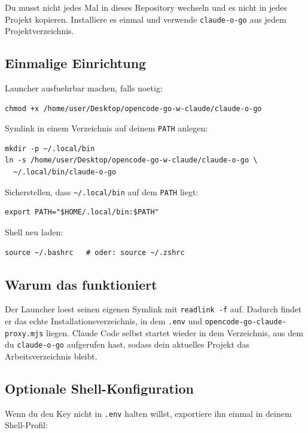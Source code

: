 \documentclass[11pt,a4paper]{article}
\newcommand{\code}[1]{\texttt{#1}}
\begin{document}
Du musst nicht jedes Mal in dieses Repository wechseln und es nicht in jedes
Projekt kopieren. Installiere es einmal und verwende \code{claude-o-go} aus
jedem Projektverzeichnis.

\subsection{Einmalige Einrichtung}

Launcher ausfuehrbar machen, falls noetig:

\begin{verbatim}
chmod +x /home/user/Desktop/opencode-go-w-claude/claude-o-go
\end{verbatim}

Symlink in einem Verzeichnis auf deinem \code{PATH} anlegen:

\begin{verbatim}
mkdir -p ~/.local/bin
ln -s /home/user/Desktop/opencode-go-w-claude/claude-o-go \
  ~/.local/bin/claude-o-go
\end{verbatim}

Sicherstellen, dass \code{\textasciitilde{}/.local/bin} auf dem \code{PATH} liegt:

\begin{verbatim}
export PATH="$HOME/.local/bin:$PATH"
\end{verbatim}

Shell neu laden:

\begin{verbatim}
source ~/.bashrc   # oder: source ~/.zshrc
\end{verbatim}

\subsection{Warum das funktioniert}

Der Launcher loest seinen eigenen Symlink mit \code{readlink -f} auf. Dadurch
findet er das echte Installationsverzeichnis, in dem \code{.env} und
\code{opencode-go-claude-proxy.mjs} liegen. Claude Code selbst startet wieder
in dem Verzeichnis, aus dem du \code{claude-o-go} aufgerufen hast, sodass dein
aktuelles Projekt das Arbeitsverzeichnis bleibt.

\subsection{Optionale Shell-Konfiguration}

Wenn du den Key nicht in \code{.env} halten willst, exportiere ihn einmal in
deinem Shell-Profil:
\end{document}
